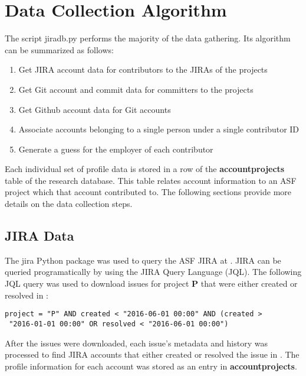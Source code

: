 \section{Data Collection Algorithm}
The script jiradb.py performs the majority of the data gathering. Its algorithm can be summarized as follows:
\begin{enumerate}
	\item Get JIRA account data for contributors to the JIRAs of the projects
	\item Get Git account and commit data for committers to the projects
	\item Get Github account data for Git accounts 
	\item Associate accounts belonging to a single person under a single contributor ID  
	\item Generate a guess for the employer of each contributor  
\end{enumerate}

Each individual set of profile data is stored in a row of the \textbf{accountprojects} table of the research database. This table relates account information to an ASF project which that account contributed to. The following sections provide more details on the data collection steps.

\subsection{JIRA Data}
 
The jira Python package was used to query the ASF JIRA at \ASFJIRAURL. JIRA can be queried programatically by using the JIRA Query Language (JQL). The following JQL query was used to download issues for project \textbf{P} that were either created or resolved in \timeperiod:
\begin{lstlisting}
project = "P" AND created < "2016-06-01 00:00" AND (created >
 "2016-01-01 00:00" OR resolved < "2016-06-01 00:00")
\end{lstlisting}
After the issues were downloaded, each issue's metadata and history was processed to find JIRA accounts that either created or resolved the issue in \timeperiod. The profile information for each account was stored as an entry in \textbf{accountprojects}.
